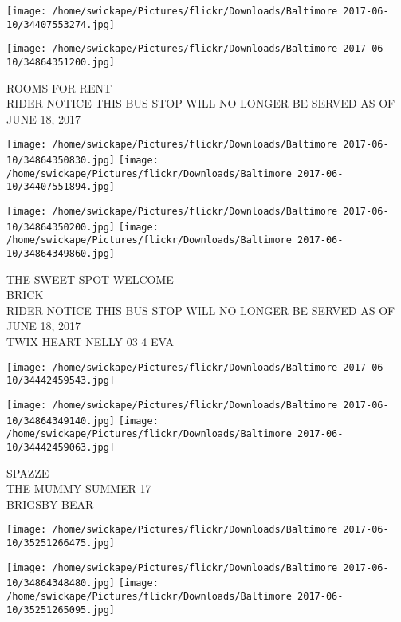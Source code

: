 \documentclass[10pt,letterpaper]{article}
\begin{document}
\texttt{[image: /home/swickape/Pictures/flickr/Downloads/Baltimore 2017-06-10/34407553274.jpg]}

\vspace{0.25in}
\texttt{[image: /home/swickape/Pictures/flickr/Downloads/Baltimore 2017-06-10/34864351200.jpg]}

ROOMS FOR RENT\\
RIDER NOTICE THIS BUS STOP WILL NO LONGER BE SERVED AS OF JUNE 18, 2017\\
\pagebreak

\texttt{[image: /home/swickape/Pictures/flickr/Downloads/Baltimore 2017-06-10/34864350830.jpg]}
\texttt{[image: /home/swickape/Pictures/flickr/Downloads/Baltimore 2017-06-10/34407551894.jpg]}

\texttt{[image: /home/swickape/Pictures/flickr/Downloads/Baltimore 2017-06-10/34864350200.jpg]}
\texttt{[image: /home/swickape/Pictures/flickr/Downloads/Baltimore 2017-06-10/34864349860.jpg]}

THE SWEET SPOT WELCOME\\
BRICK\\
RIDER NOTICE THIS BUS STOP WILL NO LONGER BE SERVED AS OF JUNE 18, 2017\\
TWIX HEART NELLY 03 4 EVA\\
\pagebreak

\texttt{[image: /home/swickape/Pictures/flickr/Downloads/Baltimore 2017-06-10/34442459543.jpg]}

\vspace{0.25in}
\texttt{[image: /home/swickape/Pictures/flickr/Downloads/Baltimore 2017-06-10/34864349140.jpg]}
\texttt{[image: /home/swickape/Pictures/flickr/Downloads/Baltimore 2017-06-10/34442459063.jpg]}

SPAZZE\\
THE MUMMY SUMMER 17\\
BRIGSBY BEAR\\
\pagebreak

\texttt{[image: /home/swickape/Pictures/flickr/Downloads/Baltimore 2017-06-10/35251266475.jpg]}

\vspace{0.25in}
\texttt{[image: /home/swickape/Pictures/flickr/Downloads/Baltimore 2017-06-10/34864348480.jpg]}
\texttt{[image: /home/swickape/Pictures/flickr/Downloads/Baltimore 2017-06-10/35251265095.jpg]}
\end{document}
